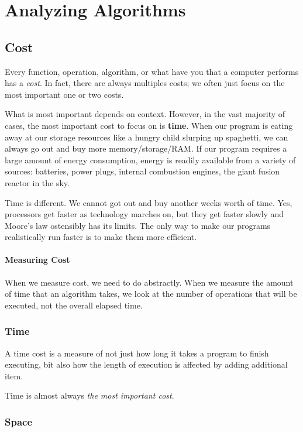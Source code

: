 \chapter{Analyzing Algorithms}

\section{Cost}
Every function, operation, algorithm, or what have you that a computer performs has a \emph{cost}. 
In fact, there are always multiples costs;  we often just focus on the most important one or two costs.  

What is most important depends on context.
However, in the vast majority of cases, the most important cost to focus on is \textbf{time}.
When our program is eating away at our storage resources like a hungry child slurping up spaghetti, we can always go out and buy more memory/storage/RAM.
If our program requires a large amount of energy consumption, energy is readily available from a variety of sources: batteries, power plugs, internal combustion engines, the giant fusion reactor in the sky.

Time is different.  We cannot got out and buy another weeks worth of time.  
Yes, processors get faster as technology marches on, but they get faster slowly and Moore's law ostensibly has its limits.
The only way to make our programs realistically run faster is to make them more efficient.
 


\subsubsection*{Measuring Cost}
When we measure cost, we need to do abstractly.  
When we measure the amount of time that an algorithm takes, we look at the number of operations that will be executed, not the overall elapsed time.

\subsection{Time}
A time cost is a measure of not just how long it takes a program to finish executing, bit also how the length of execution is affected by adding additional item.

Time is almost always \emph{the most important cost}.

\subsection{Space}


